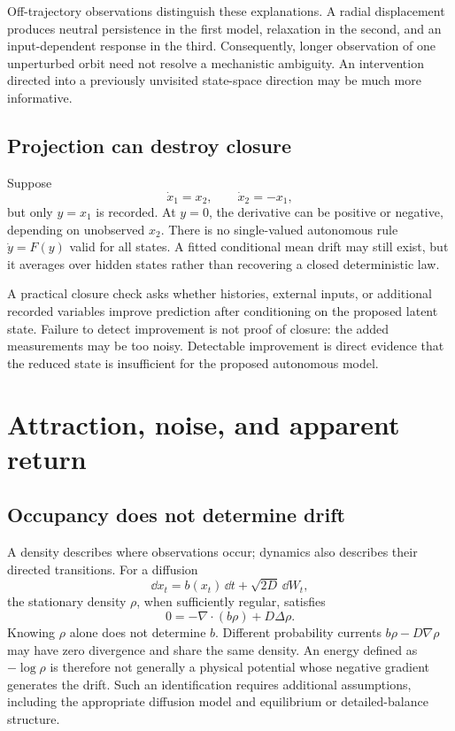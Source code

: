 Off-trajectory observations distinguish these explanations. A radial displacement produces neutral persistence in the first model, relaxation in the second, and an input-dependent response in the third. Consequently, longer observation of one unperturbed orbit need not resolve a mechanistic ambiguity. An intervention directed into a previously unvisited state-space direction may be much more informative.

\subsection{Projection can destroy closure}
Suppose
\[
\dot x_1=x_2,\qquad \dot x_2=-x_1,
\]
but only \(y=x_1\) is recorded. At \(y=0\), the derivative can be positive or negative, depending on unobserved \(x_2\). There is no single-valued autonomous rule \(\dot y=F(y)\) valid for all states. A fitted conditional mean drift may still exist, but it averages over hidden states rather than recovering a closed deterministic law.

A practical closure check asks whether histories, external inputs, or additional recorded variables improve prediction after conditioning on the proposed latent state. Failure to detect improvement is not proof of closure: the added measurements may be too noisy. Detectable improvement is direct evidence that the reduced state is insufficient for the proposed autonomous model.

\section{Attraction, noise, and apparent return}
\subsection{Occupancy does not determine drift}
A density describes where observations occur; dynamics also describes their directed transitions. For a diffusion
\[
\dd x_t=b(x_t)\,\dd t+\sqrt{2D}\,\dd W_t,
\]
the stationary density \(\rho\), when sufficiently regular, satisfies
\[
0=-\nabla\cdot(b\rho)+D\Delta\rho.
\]
Knowing \(\rho\) alone does not determine \(b\). Different probability currents \(b\rho-D\nabla\rho\) may have zero divergence and share the same density. An energy defined as \(-\log\rho\) is therefore not generally a physical potential whose negative gradient generates the drift. Such an identification requires additional assumptions, including the appropriate diffusion model and equilibrium or detailed-balance structure.

